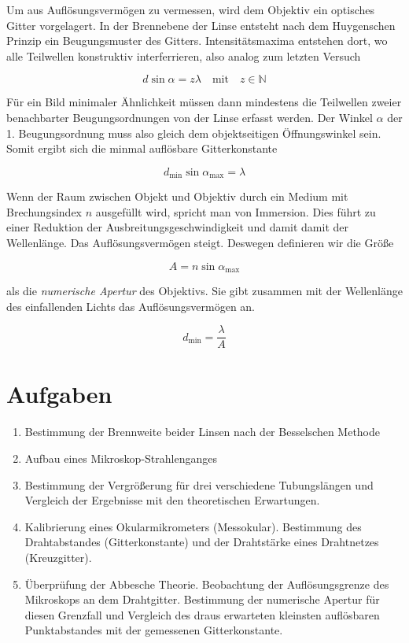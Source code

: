 \documentclass[a4paper,german,12pt,smallheadings]{scrartcl}
\begin{document}
Um aus Auflösungsvermögen zu vermessen, wird dem Objektiv ein optisches Gitter
vorgelagert. In der Brennebene der Linse entsteht nach dem Huygenschen Prinzip
ein Beugungsmuster des Gitters. Intensitätsmaxima entstehen dort, wo alle
Teilwellen konstruktiv interferrieren, also analog zum letzten Versuch

\begin{equation}
  d \sin \alpha = z \lambda \quad \text{mit} \quad z \in \mathbb{N}
\end{equation}

Für ein Bild minimaler Ähnlichkeit müssen dann mindestens die Teilwellen zweier
benachbarter Beugungsordnungen von der Linse erfasst werden. Der Winkel $\alpha$ der 1.
Beugungsordnung muss also gleich dem objektseitigen Öffnungswinkel sein. Somit
ergibt sich die minmal auflösbare Gitterkonstante

\begin{equation}
  d_\text{min} \sin \alpha_\text{max} = \lambda
  \label{eq:dmin}
\end{equation}

Wenn der Raum zwischen Objekt und Objektiv durch ein Medium mit Brechungsindex
$n$ ausgefüllt wird, spricht man von Immersion. Dies führt zu einer Reduktion
der Ausbreitungsgeschwindigkeit und damit damit der Wellenlänge. Das
Auflösungsvermögen steigt. Deswegen definieren wir die Größe

\begin{equation}
  A = n \sin \alpha_\text{max}
  \label{eq:aper}
\end{equation}

als die \textit{numerische Apertur} des Objektivs. Sie gibt zusammen mit der
Wellenlänge des einfallenden Lichts das Auflösungsvermögen an.

\begin{equation}
  d_\text{min} = \frac{\lambda}{A}
\end{equation}


\section{Aufgaben}
\begin{enumerate}
  \item Bestimmung der Brennweite beider Linsen nach der Besselschen Methode
  \item Aufbau eines Mikroskop-Strahlenganges
  \item Bestimmung der Vergrößerung für drei verschiedene Tubungslängen und
    Vergleich der Ergebnisse mit den theoretischen Erwartungen.
  \item Kalibrierung eines Okularmikrometers (Messokular). Bestimmung des
    Drahtabstandes (Gitterkonstante) und der Drahtstärke eines Drahtnetzes
    (Kreuzgitter).
  \item Überprüfung der Abbesche Theorie. Beobachtung der Auflösungsgrenze des
    Mikroskops an dem Drahtgitter. Bestimmung der numerische Apertur für diesen
    Grenzfall und Vergleich des draus erwarteten kleinsten auflösbaren
    Punktabstandes mit der gemessenen Gitterkonstante.
\end{enumerate}
\end{document}
